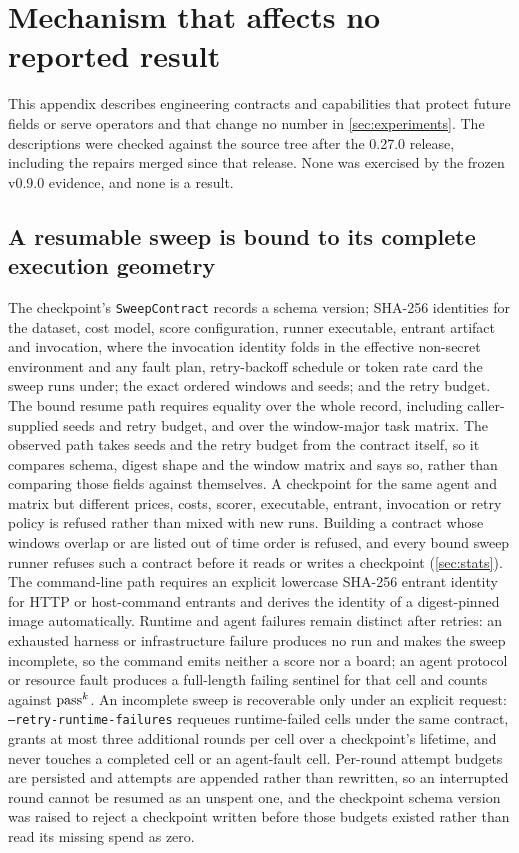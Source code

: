 \section{Mechanism that affects no reported result}\label{app:mechanism}

This appendix describes engineering contracts and capabilities that protect future fields or serve operators and that change no number in \cref{sec:experiments}. The descriptions were checked against the source tree after the 0.27.0 release, including the repairs merged since that release. None was exercised by the frozen v0.9.0 evidence, and none is a result.

\subsection{A resumable sweep is bound to its complete execution geometry}\label{app:sweep}

The checkpoint's \texttt{SweepContract} records a schema version; SHA-256 identities for the dataset, cost model, score configuration, runner executable, entrant artifact and invocation, where the invocation identity folds in the effective non-secret environment and any fault plan, retry-backoff schedule or token rate card the sweep runs under; the exact ordered windows and seeds; and the retry budget. The bound resume path requires equality over the whole record, including caller-supplied seeds and retry budget, and over the window-major task matrix. The observed path takes seeds and the retry budget from the contract itself, so it compares schema, digest shape and the window matrix and says so, rather than comparing those fields against themselves. A checkpoint for the same agent and matrix but different prices, costs, scorer, executable, entrant, invocation or retry policy is refused rather than mixed with new runs. Building a contract whose windows overlap or are listed out of time order is refused, and every bound sweep runner refuses such a contract before it reads or writes a checkpoint (\cref{sec:stats}). The command-line path requires an explicit lowercase SHA-256 entrant identity for HTTP or host-command entrants and derives the identity of a digest-pinned image automatically. Runtime and agent failures remain distinct after retries: an exhausted harness or infrastructure failure produces no run and makes the sweep incomplete, so the command emits neither a score nor a board; an agent protocol or resource fault produces a full-length failing sentinel for that cell and counts against $\text{pass}^{k}$. An incomplete sweep is recoverable only under an explicit request: \texttt{--retry-runtime-failures} requeues runtime-failed cells under the same contract, grants at most three additional rounds per cell over a checkpoint's lifetime, and never touches a completed cell or an agent-fault cell. Per-round attempt budgets are persisted and attempts are appended rather than rewritten, so an interrupted round cannot be resumed as an unspent one, and the checkpoint schema version was raised to reject a checkpoint written before those budgets existed rather than read its missing spend as zero.

